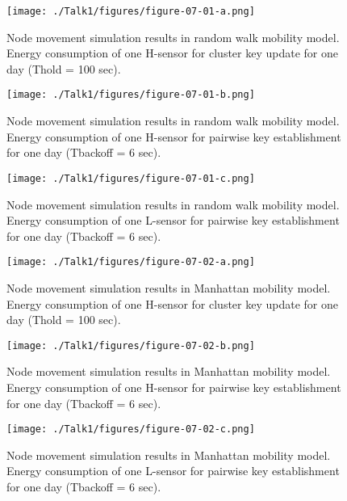 \documentclass[12pt,a4paper,twoside]{report}
\begin{document}
\begin{figure}[ht]
	\begin{center}
  \texttt{[image: ./Talk1/figures/figure-07-01-a.png]}
  \end{center}
  \caption{Node movement simulation results in random walk mobility model. Energy consumption of one H-sensor for cluster key update for one day (Thold = 100 sec). \cite{seo;etal:2015}}
  \label{fig:07-01-a}
\end{figure}
\begin{figure}[ht]
	\begin{center}
  \texttt{[image: ./Talk1/figures/figure-07-01-b.png]}
  \end{center}
  \caption{Node movement simulation results in random walk mobility model. Energy consumption of one H-sensor for pairwise key establishment for one day (Tbackoff = 6 sec). \cite{seo;etal:2015}}
  \label{fig:07-01-b}
\end{figure}
\begin{figure}[ht]
	\begin{center}
  \texttt{[image: ./Talk1/figures/figure-07-01-c.png]}
  \end{center}
  \caption{Node movement simulation results in random walk mobility model. Energy consumption of one L-sensor for pairwise key establishment for one day (Tbackoff = 6 sec).\cite{seo;etal:2015}}
  \label{fig:07-01-c}
\end{figure}

\begin{figure}[ht]
	\begin{center}
  \texttt{[image: ./Talk1/figures/figure-07-02-a.png]}
  \end{center}
  \caption{Node movement simulation results in Manhattan mobility model. Energy consumption of one H-sensor for cluster key update for one day (Thold = 100 sec). \cite{seo;etal:2015}}
  \label{fig:07-02-a}
\end{figure}
\begin{figure}[ht]
	\begin{center}
  \texttt{[image: ./Talk1/figures/figure-07-02-b.png]}
  \end{center}
  \caption{Node movement simulation results in Manhattan mobility model. Energy consumption of one H-sensor for pairwise key establishment for one day (Tbackoff = 6 sec). \cite{seo;etal:2015}}
  \label{fig:07-02-b}
\end{figure}
\begin{figure}[ht]
	\begin{center}
  \texttt{[image: ./Talk1/figures/figure-07-02-c.png]}
  \end{center}
  \caption{Node movement simulation results in Manhattan mobility model. Energy consumption of one L-sensor for pairwise key establishment for one day (Tbackoff = 6 sec).\cite{seo;etal:2015}}
  \label{fig:07-02-c}
\end{figure}
\end{document}
